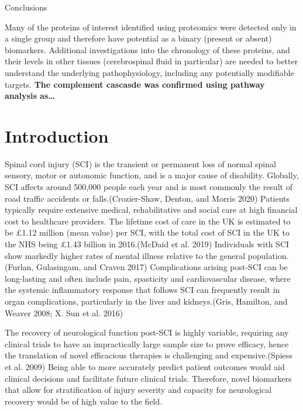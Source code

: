 \documentclass[9pt,lineno]{elife}
\begin{document}
Conclusions

Many of the proteins of interest identified using proteomics were detected only in a single group and therefore have potential as a binary (present or absent) biomarkers. Additional investigations into the chronology of these proteins, and their levels in other tissues (cerebrospinal fluid in particular) are needed to better understand the underlying pathophysiology, including any potentially modifiable targets. \textbf{The complement cascasde was confirmed using pathway analysis as\ldots{}}

\hypertarget{introduction}{%
\section{Introduction}\label{introduction}}

Spinal cord injury (SCI) is the transient or permanent loss of normal spinal sensory, motor or autonomic function, and is a major cause of disability. Globally, SCI affects around 500,000 people each year and is most commonly the result of road traffic accidents or falls.(Crozier-Shaw, Denton, and Morris 2020)
Patients typically require extensive medical, rehabilitative and social care at high financial cost to healthcare providers. The lifetime cost of care in the UK is estimated to be £1.12 million (mean value) per SCI, with the total cost of SCI in the UK to the NHS being £1.43 billion in 2016.(McDaid et al. 2019)
Individuals with SCI show markedly higher rates of mental illness relative to the general population.(Furlan, Gulasingam, and Craven 2017)
Complications arising post-SCI can be long-lasting and often include pain, spasticity and cardiovascular disease, where the systemic inflammatory response that follows SCI can frequently result in organ complications, particularly in the liver and kidneys.(Gris, Hamilton, and Weaver 2008; X. Sun et al. 2016)

The recovery of neurological function post-SCI is highly variable, requiring any clinical trials to have an impractically large sample size to prove efficacy, hence the translation of novel efficacious therapies is challenging and expensive.(Spiess et al. 2009)
Being able to more accurately predict patient outcomes would aid clinical decisions and facilitate future clinical trials. Therefore, novel biomarkers that allow for stratification of injury severity and capacity for neurological recovery would be of high value to the field.
\end{document}

